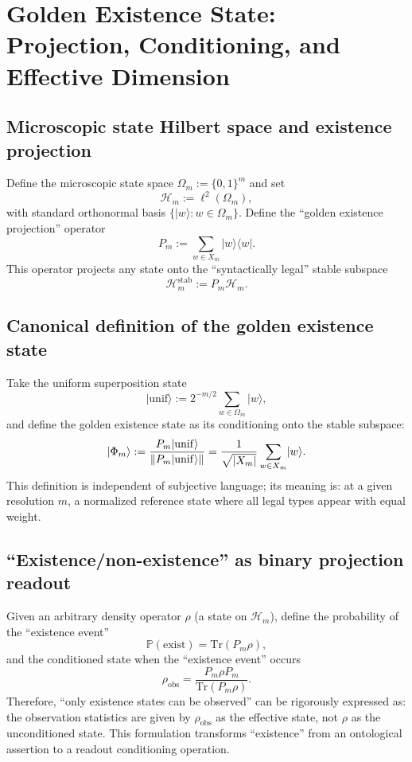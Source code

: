 \section{Golden Existence State: Projection, Conditioning, and Effective Dimension}

\subsection{Microscopic state Hilbert space and existence projection}

Define the microscopic state space $\Omega_m:=\{0,1\}^m$ and set
\[
\mathcal H_m:=\ell^2(\Omega_m),
\]
with standard orthonormal basis $\{\lvert w\rangle:w\in\Omega_m\}$. Define the ``golden existence projection'' operator
\[
P_m:=\sum_{w\in X_m}\lvert w\rangle\langle w\rvert.
\]
This operator projects any state onto the ``syntactically legal'' stable subspace
\[
\mathcal H_m^{\mathrm{stab}}:=P_m\mathcal H_m.
\]

\subsection{Canonical definition of the golden existence state}

Take the uniform superposition state
\[
\lvert\mathrm{unif}\rangle:=2^{-m/2}\sum_{w\in\Omega_m}\lvert w\rangle,
\]
and define the golden existence state as its conditioning onto the stable subspace:
\[
\lvert\Phi_m\rangle:=\frac{P_m\lvert\mathrm{unif}\rangle}{\left\lVert P_m\lvert\mathrm{unif}\rangle\right\rVert}
=\frac{1}{\sqrt{\left\lvert X_m\right\rvert}}\sum_{w\in X_m}\lvert w\rangle.
\]
This definition is independent of subjective language; its meaning is: at a given resolution $m$, a normalized reference state where all legal types appear with equal weight.

\subsection{``Existence/non-existence'' as binary projection readout}

Given an arbitrary density operator $\rho$ (a state on $\mathcal H_m$), define the probability of the ``existence event''
\[
\mathbb P(\mathrm{exist})=\mathrm{Tr}(P_m\rho),
\]
and the conditioned state when the ``existence event'' occurs
\[
\rho_{\mathrm{obs}}=\frac{P_m\rho P_m}{\mathrm{Tr}(P_m\rho)}.
\]
Therefore, ``only existence states can be observed'' can be rigorously expressed as: the observation statistics are given by $\rho_{\mathrm{obs}}$ as the effective state, not $\rho$ as the unconditioned state. This formulation transforms ``existence'' from an ontological assertion to a readout conditioning operation.

